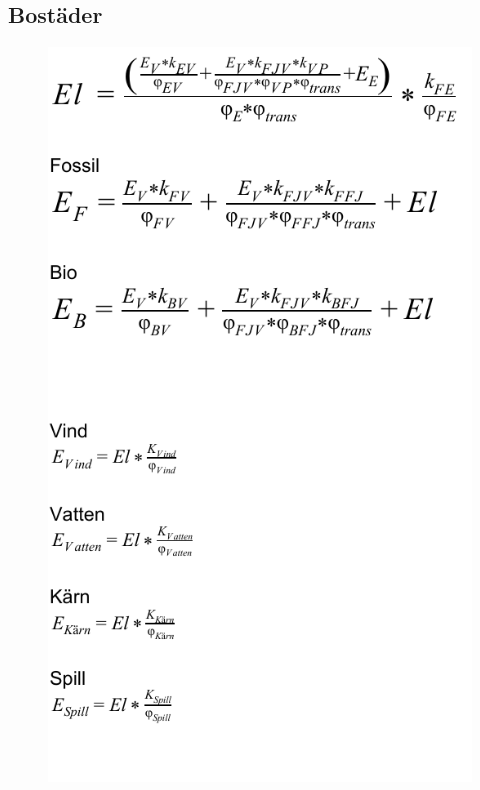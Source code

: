 \documentclass[a4paper,11pt,fleqn, titlepage]{article}
\begin{document}
\subsection{Bostäder}
\begin{figure}[h!]
	\centering 
 		\includegraphics[scale = 0.75]{homes2.pdf}
		\label{diagram}
\end{figure}
\end{document}
